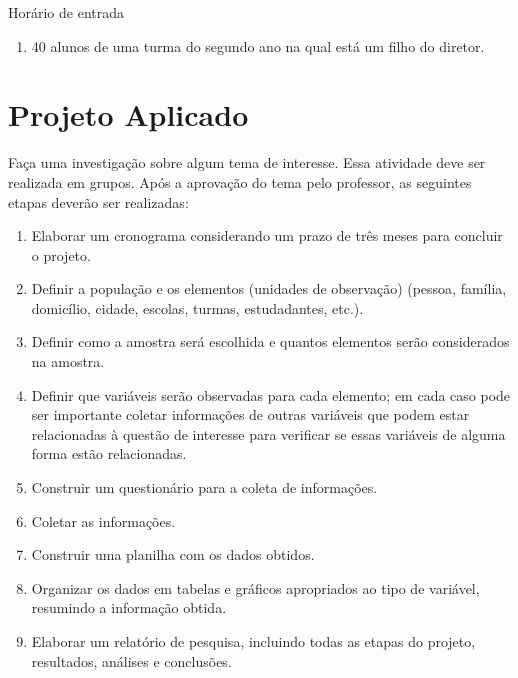 \begin{example}{Horário de entrada}
\begin{enumerate}
\item {} 
40 alunos de uma turma do segundo ano na qual está um filho do diretor. 

\end{enumerate}
\end{example}


\section{Projeto Aplicado}
\label{\detokenize{PE103-A:projeto}}\label{\detokenize{PE103-A:id1}}

Faça uma investigação sobre algum tema de interesse. Essa atividade deve ser realizada em grupos.  Após a aprovação do tema pelo professor, as seguintes etapas deverão ser realizadas:
\begin{enumerate}
\item {} 
Elaborar um cronograma considerando um prazo de três meses para concluir o projeto.

\item {} 
Definir a população e os elementos (unidades de observação) (pessoa, família, domicílio, cidade, escolas, turmas, estudadantes, etc.).

\item {} 
Definir como a amostra será escolhida e quantos elementos serão considerados na amostra.

\item {} 
Definir que variáveis serão observadas para cada elemento; em cada caso pode ser importante coletar informações de outras variáveis que podem estar relacionadas à questão de interesse para verificar se essas variáveis de alguma forma estão relacionadas.

\item {} 
Construir um questionário para a coleta de informações.

\item {} 
Coletar as informações.

\item {} 
Construir uma planilha com os dados obtidos.

\item {} 
Organizar os dados em tabelas e gráficos apropriados ao tipo de variável, resumindo a informação obtida.

\item {} 
Elaborar um relatório de pesquisa, incluindo todas as etapas do projeto, resultados, análises e conclusões.

\end{enumerate}


